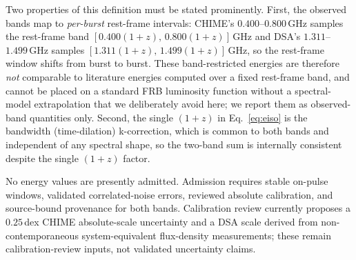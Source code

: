 Two properties of this definition must be stated prominently. First, the
observed bands map to \emph{per-burst} rest-frame intervals: CHIME's
$0.400$--$0.800\,\mathrm{GHz}$ samples the rest-frame band
$[0.400(1+z),\,0.800(1+z)]\,\mathrm{GHz}$ and DSA's
$1.311$--$1.499\,\mathrm{GHz}$ samples $[1.311(1+z),\,1.499(1+z)]\,\mathrm{GHz}$,
so the rest-frame window shifts from burst to burst. These band-restricted
energies are therefore \emph{not} comparable to literature energies computed
over a fixed rest-frame band, and cannot be placed on a standard FRB luminosity
function without a spectral-model extrapolation that we deliberately avoid here;
we report them as observed-band quantities only. Second, the single $(1+z)$ in
Eq.~\ref{eq:eiso} is the bandwidth (time-dilation) k-correction, which is common
to both bands and independent of any spectral shape, so the two-band sum is
internally consistent despite the single $(1+z)$ factor.

No energy values are presently admitted. Admission requires stable on-pulse
windows, validated correlated-noise errors, reviewed absolute calibration, and
source-bound provenance for both bands. Calibration review currently proposes
a $0.25$\,dex CHIME absolute-scale uncertainty and a DSA scale derived from
non-contemporaneous system-equivalent flux-density measurements; these remain
calibration-review inputs, not validated uncertainty claims.
